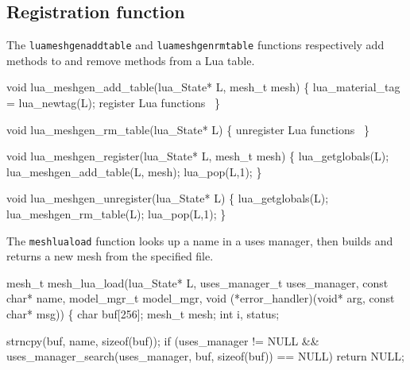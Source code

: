 \nwendcode{}\nwdocspar


\subsection{Registration function}

The {\tt{}lua{}meshgen{}add{}table} and {\tt{}lua{}meshgen{}rm{}table} functions
respectively add methods to and remove methods from a Lua table.

\nwenddocs{}\plusendmoddef
void lua_meshgen_add_table(lua_State* L, mesh_t mesh)
\{
    lua_material_tag = lua_newtag(L);
    \LA{}register Lua functions~{\nwtagstyle{}}\RA{}
\}

void lua_meshgen_rm_table(lua_State* L)
\{
    \LA{}unregister Lua functions~{\nwtagstyle{}}\RA{}
\}

\nwendcode{}\nwdocspar

\nwenddocs{}\plusendmoddef
void lua_meshgen_register(lua_State* L, mesh_t mesh)
\{
    lua_getglobals(L);
    lua_meshgen_add_table(L, mesh);
    lua_pop(L,1);
\}

void lua_meshgen_unregister(lua_State* L)
\{
    lua_getglobals(L);
    lua_meshgen_rm_table(L);
    lua_pop(L,1);
\}

\nwendcode{}\nwdocspar

The {\tt{}mesh{}lua{}load} function looks up a name in a uses manager,
then builds and returns a new mesh from the specified file.

\nwenddocs{}\plusendmoddef
mesh_t mesh_lua_load(lua_State* L, 
                     uses_manager_t uses_manager, const char* name,
                     model_mgr_t model_mgr,
                     void (*error_handler)(void* arg, const char* msg))
\{
    char buf[256];
    mesh_t mesh;
    int i, status;

    strncpy(buf, name, sizeof(buf));
    if (uses_manager != NULL &&
            uses_manager_search(uses_manager, buf, sizeof(buf)) == NULL)
        return NULL;

